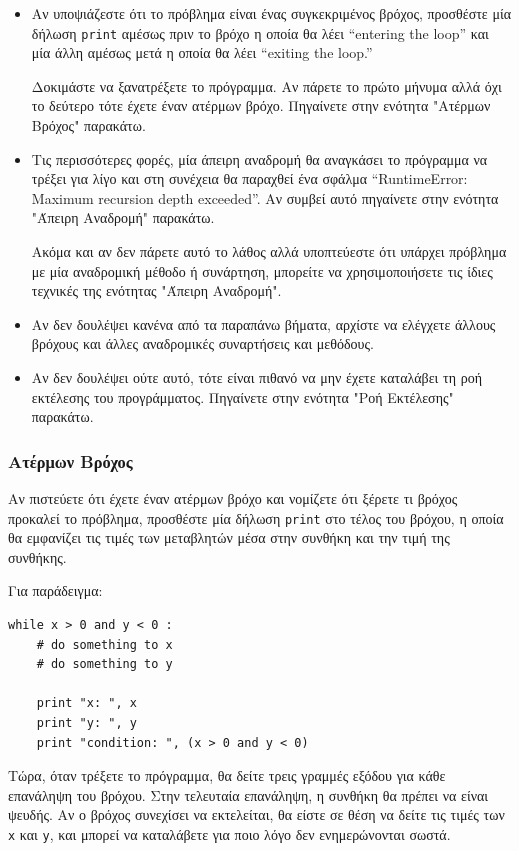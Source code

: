 \documentclass[10pt]{book}
\begin{document}
\begin{itemize}

\item Αν υποψιάζεστε ότι το πρόβλημα είναι ένας συγκεκριμένος βρόχος, προσθέστε 
μία δήλωση {\tt print} αμέσως πριν το βρόχο η οποία θα λέει ``entering the loop'' και μία άλλη
αμέσως μετά η οποία θα λέει ``exiting the loop.''

Δοκιμάστε να ξανατρέξετε το πρόγραμμα. Αν πάρετε το πρώτο μήνυμα αλλά όχι το δεύτερο τότε έχετε έναν
ατέρμων βρόχο.  Πηγαίνετε στην ενότητα "Ατέρμων Βρόχος" παρακάτω.

\item Τις περισσότερες φορές, μία άπειρη αναδρομή θα αναγκάσει το πρόγραμμα να τρέξει για λίγο και στη
συνέχεια θα παραχθεί ένα σφάλμα ``RuntimeError: Maximum recursion depth exceeded''. Αν συμβεί αυτό πηγαίνετε
στην ενότητα "Άπειρη Αναδρομή" παρακάτω.

Ακόμα και αν δεν πάρετε αυτό το λάθος αλλά υποπτεύεστε ότι υπάρχει πρόβλημα με μία αναδρομική μέθοδο ή συνάρτηση,
μπορείτε να χρησιμοποιήσετε τις ίδιες τεχνικές της ενότητας "Άπειρη Αναδρομή". 

\item Αν δεν δουλέψει κανένα από τα παραπάνω βήματα, αρχίστε να ελέγχετε άλλους 
βρόχους και άλλες αναδρομικές συναρτήσεις και μεθόδους.

\item Αν δεν δουλέψει ούτε αυτό, τότε είναι πιθανό να μην έχετε καταλάβει τη ροή 
εκτέλεσης του προγράμματος.  Πηγαίνετε στην ενότητα "Ροή Εκτέλεσης" παρακάτω.

\end{itemize}


\subsubsection{Ατέρμων Βρόχος}

Αν πιστεύετε ότι έχετε έναν ατέρμων βρόχο και νομίζετε ότι ξέρετε τι βρόχος προκαλεί το πρόβλημα,
προσθέστε μία δήλωση {\tt print} στο τέλος του βρόχου, η οποία θα εμφανίζει τις τιμές των μεταβλητών
μέσα στην συνθήκη και την τιμή της συνθήκης.

Για παράδειγμα:

\begin{verbatim}
while x > 0 and y < 0 :
    # do something to x
    # do something to y

    print "x: ", x
    print "y: ", y
    print "condition: ", (x > 0 and y < 0)
\end{verbatim}
%
Τώρα, όταν τρέξετε το πρόγραμμα, θα δείτε τρεις γραμμές εξόδου για κάθε επανάληψη του βρόχου.
Στην τελευταία επανάληψη, η συνθήκη θα πρέπει να είναι ψευδής. Αν ο βρόχος συνεχίσει να εκτελείται,
θα είστε σε θέση να δείτε τις τιμές των {\tt x} και {\tt y}, και μπορεί να καταλάβετε για ποιο λόγο δεν
ενημερώνονται σωστά.
\end{document}
